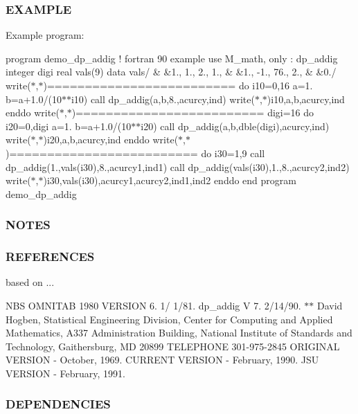 \subsubsection*{E\+X\+A\+M\+P\+LE}

Example program\+:

program demo\+\_\+dp\+\_\+addig ! fortran 90 example use M\+\_\+math, only \+: dp\+\_\+addig integer digi real vals(9) data vals/ \& \&1., 1., 2., 1., \& \&1., -\/1., 76., 2., \& \&0./ write($\ast$,$\ast$)\textquotesingle{}=========================\textquotesingle{} do i10=0,16 a=1. b=a+1.0/(10$\ast$$\ast$i10) call dp\+\_\+addig(a,b,8.,acurcy,ind) write($\ast$,$\ast$)i10,a,b,acurcy,ind enddo write($\ast$,$\ast$)\textquotesingle{}=========================\textquotesingle{} digi=16 do i20=0,digi a=1. b=a+1.0/(10$\ast$$\ast$i20) call dp\+\_\+addig(a,b,dble(digi),acurcy,ind) write($\ast$,$\ast$)i20,a,b,acurcy,ind enddo write($\ast$,$\ast$)\textquotesingle{}=========================\textquotesingle{} do i30=1,9 call dp\+\_\+addig(1.,vals(i30),8.,acurcy1,ind1) call dp\+\_\+addig(vals(i30),1.,8.,acurcy2,ind2) write($\ast$,$\ast$)i30,vals(i30),acurcy1,acurcy2,ind1,ind2 enddo end program demo\+\_\+dp\+\_\+addig

\subsubsection*{N\+O\+T\+ES}

\subsubsection*{R\+E\+F\+E\+R\+E\+N\+C\+ES}

based on ...

N\+BS O\+M\+N\+I\+T\+AB 1980 V\+E\+R\+S\+I\+ON 6. 1/ 1/81. dp\+\_\+addig V 7. 2/14/90. $\ast$$\ast$ David Hogben, Statistical Engineering Division, Center for Computing and Applied Mathematics, A337 Administration Building, National Institute of Standards and Technology, Gaithersburg, MD 20899 T\+E\+L\+E\+P\+H\+O\+NE 301-\/975-\/2845 O\+R\+I\+G\+I\+N\+AL V\+E\+R\+S\+I\+ON -\/ October, 1969. C\+U\+R\+R\+E\+NT V\+E\+R\+S\+I\+ON -\/ February, 1990. J\+SU V\+E\+R\+S\+I\+ON -\/ February, 1991.

\subsubsection*{D\+E\+P\+E\+N\+D\+E\+N\+C\+I\+ES}

